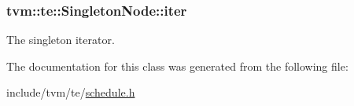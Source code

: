 \subsubsection[{\texorpdfstring{iter}{iter}}]{ tvm\+::te\+::\+Singleton\+Node\+::iter}\hypertarget{classtvm_1_1te_1_1SingletonNode_a4a33beb28fc1394654684ad92aca226d}{}\label{classtvm_1_1te_1_1SingletonNode_a4a33beb28fc1394654684ad92aca226d}


The singleton iterator. 



The documentation for this class was generated from the following file\+:\begin{DoxyCompactItemize}
\item 
include/tvm/te/\hyperlink{schedule_8h}{schedule.\+h}\end{DoxyCompactItemize}
